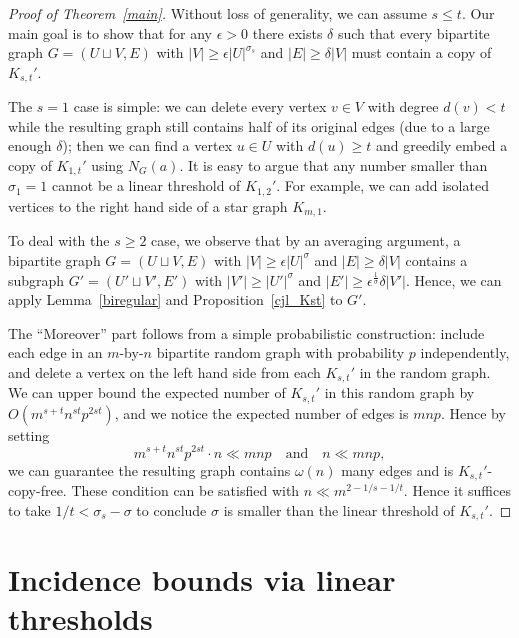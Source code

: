 \documentclass[11pt]{article}
\theoremstyle{definition}
\begin{document}
\begin{proof}[Proof of Theorem~\ref{main}]
    Without loss of generality, we can assume $s \leq t$. Our main goal is to show that for any $\epsilon>0$ there exists $\delta$ such that every bipartite graph $G = (U \sqcup V, E)$ with $|V| \geq \epsilon|U|^{\sigma_s}$ and $|E| \geq \delta|V|$ must contain a copy of $K_{s,t}'$.

    The $s=1$ case is simple: we can delete every vertex $v \in V$ with degree $d(v) < t$ while the resulting graph still contains half of its original edges (due to a large enough $\delta$); then we can find a vertex $u \in U$ with $d(u) \geq t$ and greedily embed a copy of $K_{1,t}'$ using $N_G(a)$. It is easy to argue that any number smaller than $\sigma_1 = 1$ cannot be a linear threshold of $K_{1,2}'$. For example, we can add isolated vertices to the right hand side of a star graph $K_{m,1}$.

    To deal with the $s \geq 2$ case, we observe that by an averaging argument, a bipartite graph $G = (U \sqcup V, E)$ with $|V| \geq \epsilon|U|^\sigma$ and $|E| \geq \delta |V|$ contains a subgraph $G' = ( U'\sqcup V', E')$ with $|V'| \geq |U'|^{\sigma}$ and $|E'| \geq \epsilon^{\frac{1}{\sigma}}\delta|V'|$. Hence, we can apply Lemma~\ref{biregular} and Proposition~\ref{cjl_Kst} to $G'$.

    The ``Moreover'' part follows from a simple probabilistic construction: include each edge in an $m$-by-$n$ bipartite random graph with probability $p$ independently, and delete a vertex on the left hand side from each $K_{s,t}'$ in the random graph. We can upper bound the expected number of $K_{s,t}'$ in this random graph by $O(m^{s+t}n^{st}p^{2st})$, and we notice the expected number of edges is $mnp$. Hence by setting \begin{equation*}
        m^{s+t}n^{st}p^{2st} \cdot n \ll mnp \quad\text{and}\quad n \ll mnp,
    \end{equation*} we can guarantee the resulting graph contains $\omega(n)$ many edges and is $K_{s,t}'$-copy-free. These condition can be satisfied with $n \ll m^{2 - 1/s -1/t}$. Hence it suffices to take $1/t < \sigma_s - \sigma$ to conclude $\sigma$ is smaller than the linear threshold of $K_{s,t}'$.
\end{proof}

\section{Incidence bounds via linear thresholds}\label{sec_threshold2incidence}
\end{document}
